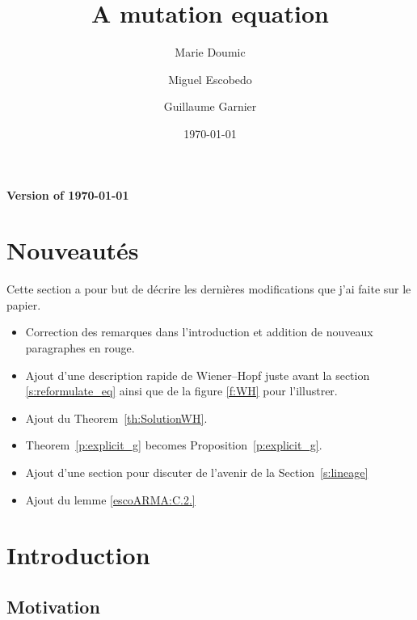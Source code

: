 \documentclass[11pt]{amsart}
\title{A mutation equation}
\author{Marie Doumic \and Miguel Escobedo \and Guillaume Garnier}
\date{\today}
\begin{document}
\maketitle
\begin{center}
    \textbf{Version of \today}
\end{center}

\tableofcontents

\section*{Nouveautés}
Cette section a pour but de décrire les dernières modifications que j'ai faite sur le papier.

\begin{itemize}
    \item Correction des remarques dans l'introduction et addition de nouveaux paragraphes en rouge. 
    \item Ajout d'une description rapide de Wiener--Hopf juste avant la section \ref{s:reformulate_eq} ainsi que de la figure \ref{f:WH} pour l'illustrer. 
    \item Ajout du Theorem~\ref{th:SolutionWH}. 
    \item Theorem~\ref{p:explicit_g} becomes Proposition~\ref{p:explicit_g}.
    \item Ajout d'une section pour discuter de l'avenir de la Section~\ref{s:lineage}
    \item Ajout du lemme \ref{escoARMA:C.2.}
\end{itemize}

\section{Introduction}

\subsection{Motivation} \mbox{}
\end{document}

